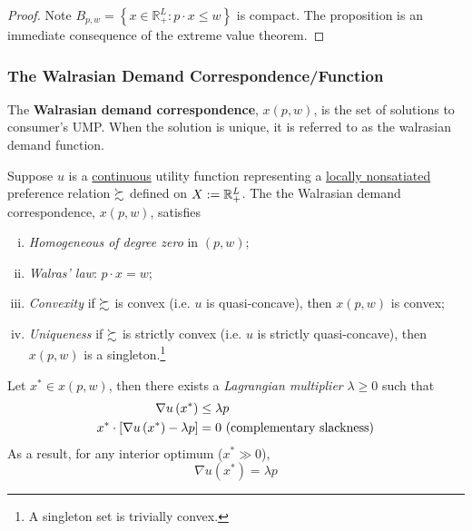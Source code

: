 \documentclass{report}
\begin{document}
 			\begin{proof}
 				Note $B_{p, w}=\left\{x \in \mathbb{R}_{+}^{L} : p \cdot x \leq w\right\}$ is compact. The proposition is an immediate consequence of the extreme value theorem.
 			\end{proof}
 			
 			\subsubsection{The Walrasian Demand Correspondence/Function}
 			
 			\begin{definition}
 				The \textbf{Walrasian demand correspondence}, $x(p, w)$, is the set of solutions to consumer's UMP. When the solution is unique, it is referred to as the walrasian demand function.
 			\end{definition}
 			
 			\begin{proposition}[3.D.2]
 				Suppose $u$ is a \ul{continuous} utility function representing a \ul{locally nonsatiated} preference relation $\succsim$ defined on $X := \mathbb{R}^L_+$. The the Walrasian demand correspondence, $x(p,w)$, satisfies
 				\begin{enumerate}[(i)]
 					\item \emph{Homogeneous of degree zero} in $(p, w)$;
 					\item \emph{Walras' law}: $p \cdot x = w$;
 					\item \emph{Convexity} if $\succsim$ is convex (i.e. $u$ is quasi-concave), then $x(p,w)$ is convex;
 					\item \emph{Uniqueness} if $\succsim$ is strictly convex (i.e. $u$ is strictly quasi-concave), then $x(p,w)$ is a singleton.\footnote{A singleton set is trivially convex.}
 				\end{enumerate}
 			\end{proposition}
 			
 			\begin{proposition}
 				Let $x^* \in x(p, w)$, then there exists a \emph{Lagrangian multiplier} $\lambda \geq 0$ such that
 				\begin{align}
 					\nabla u\left(x^{*}\right) &\leq \lambda p \\
 					x^{*} \cdot\left[\nabla u\left(x^{*}\right)-\lambda p\right]&=0 \text{{ (complementary slackness)}}
 				\end{align}
 				As a result, for any interior optimum ($x^* \gg 0$), 
 				\begin{equation}
 					\nabla u\left(x^{*}\right)=\lambda p
 				\end{equation}
 			\end{proposition}
 			
\end{document}
